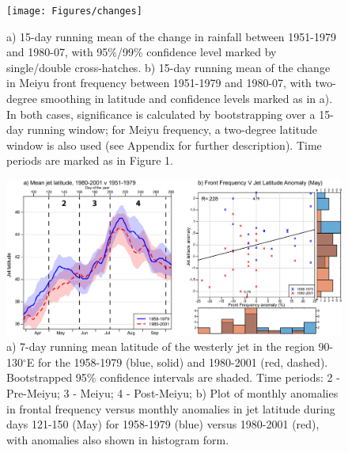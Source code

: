 \documentclass[draft,grl]{AGUTeX}
\begin{document}
\begin{figure}[htbp]
\begin{center}
\texttt{[image: Figures/changes]}
\caption{a) 15-day running mean of the change in rainfall between 1951-1979 and 1980-07, with 95\%/99\% confidence level marked by single/double cross-hatches. b) 15-day running mean of the change in Meiyu front frequency between 1951-1979 and 1980-07, with two-degree smoothing in latitude and confidence levels marked as in a). In both cases, significance is calculated by bootstrapping over a 15-day running window; for Meiyu frequency, a two-degree latitude window is also used (see Appendix for further description). Time periods are marked as in Figure 1.}
\label{changes}
\end{center}
\end{figure}

\begin{figure}[htbp]
\begin{center}
\includegraphics[width=36pc]{Figures/jet}
\caption{a) 7-day running mean latitude of the westerly jet in the region 90-130$^\circ$E for the 1958-1979 (blue, solid) and 1980-2001 (red, dashed). Bootstrapped 95\% confidence intervals are shaded. Time periods: 2 - Pre-Meiyu; 3 - Meiyu; 4 - Post-Meiyu; b) Plot of monthly anomalies in frontal frequency versus monthly anomalies in jet latitude during days 121-150 (May) for 1958-1979 (blue) versus 1980-2001 (red), with anomalies also shown in histogram form.}
\label{jet_seasonal}
\end{center}
\end{figure}


\end{document}
